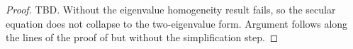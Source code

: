 \begin{proof}
    TBD. Without  the eigenvalue homogeneity result  fails, so the secular equation does not collapse to the two-eigenvalue form. Argument follows along the lines of the proof of  but without the simplification step.
\end{proof}
